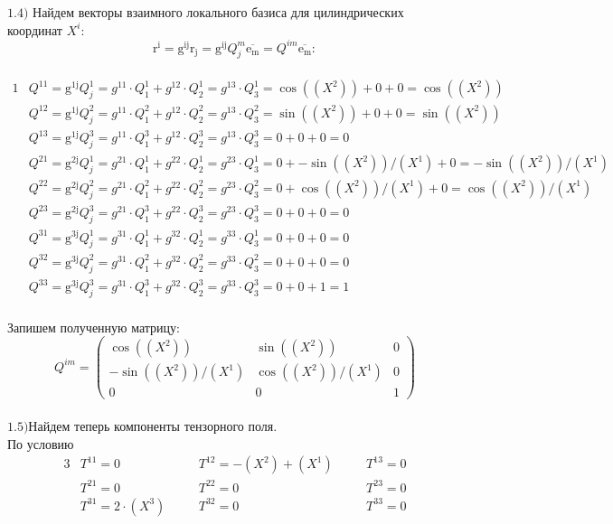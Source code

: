 \documentclass{article}
\begin{document}
$\mathrm{1.4)}$ Найдем векторы взаимного локального базиса для цилиндрических координат $X^i$:\\
\[
\mathrm{r^{i}} = \mathrm{g^{{ij}}}\mathrm{r_j} = \mathrm{g^{{ij}}}Q^m_j\overline{\mathrm{e_m}} = Q^{im}\overline{\mathrm{e_m}}:
\]\\
\begin{alignat*}{1}
  & Q^{11} = \mathrm{g^{1j}}Q^1_j = g^{11} \cdot Q^1_1+ g^{12} \cdot Q^1_2= g^{13} \cdot Q^1_3= \cos((X^2))+ 0+ 0= \cos((X^2)) \\
  & Q^{12} = \mathrm{g^{1j}}Q^2_j = g^{11} \cdot Q^2_1+ g^{12} \cdot Q^2_2= g^{13} \cdot Q^2_3= \sin((X^2))+ 0+ 0= \sin((X^2)) \\
  & Q^{13} = \mathrm{g^{1j}}Q^3_j = g^{11} \cdot Q^3_1+ g^{12} \cdot Q^3_2= g^{13} \cdot Q^3_3= 0+ 0+ 0= 0 \\
  & Q^{21} = \mathrm{g^{2j}}Q^1_j = g^{21} \cdot Q^1_1+ g^{22} \cdot Q^1_2= g^{23} \cdot Q^1_3= 0+ -\sin((X^2))/(X^1)+ 0= -\sin((X^2))/(X^1) \\
  & Q^{22} = \mathrm{g^{2j}}Q^2_j = g^{21} \cdot Q^2_1+ g^{22} \cdot Q^2_2= g^{23} \cdot Q^2_3= 0+ \cos((X^2))/(X^1)+ 0= \cos((X^2))/(X^1) \\
  & Q^{23} = \mathrm{g^{2j}}Q^3_j = g^{21} \cdot Q^3_1+ g^{22} \cdot Q^3_2= g^{23} \cdot Q^3_3= 0+ 0+ 0= 0 \\
  & Q^{31} = \mathrm{g^{3j}}Q^1_j = g^{31} \cdot Q^1_1+ g^{32} \cdot Q^1_2= g^{33} \cdot Q^1_3= 0+ 0+ 0= 0 \\
  & Q^{32} = \mathrm{g^{3j}}Q^2_j = g^{31} \cdot Q^2_1+ g^{32} \cdot Q^2_2= g^{33} \cdot Q^2_3= 0+ 0+ 0= 0 \\
  & Q^{33} = \mathrm{g^{3j}}Q^3_j = g^{31} \cdot Q^3_1+ g^{32} \cdot Q^3_2= g^{33} \cdot Q^3_3= 0+ 0+ 1= 1 
\end{alignat*}\\
Запишем полученную матрицу:\\
\[
Q^{im}=\begin{pmatrix}
	\cos((X^2)) & \sin((X^2)) & 0\\
	-\sin((X^2))/(X^1) & \cos((X^2))/(X^1) & 0\\
	0 & 0 & 1
\end{pmatrix}
\]\\
$\mathrm{1.5)}$Найдем теперь компоненты тензорного поля.\\
По условию\\
\begin{alignat*}{3}
  & T^{11} = 0 \quad &&T^{12} = -(X^2) + (X^1) \quad &&T^{13} = 0 \\
  & T^{21} = 0 \quad &&T^{22} = 0 \quad &&T^{23} = 0 \\
  & T^{31} = 2\cdot (X^3) \quad &&T^{32} = 0 \quad &&T^{33} = 0 
\end{alignat*}\\
\end{document}
